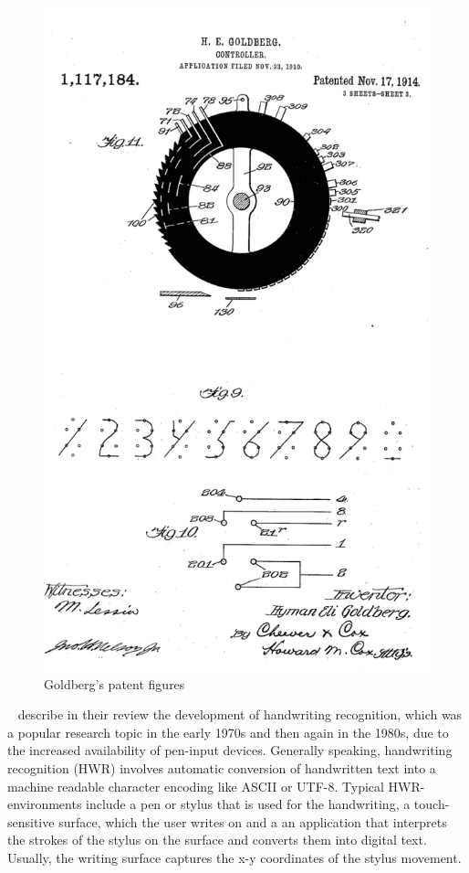 \begin{figure}[htbp]
\begin{center}
\includegraphics[scale=0.3]{images/goldberg3.png}
\caption{Goldberg's patent figures}
\label{fig:goldbergspatent}
\end{center}
\end{figure}

~\citeyear{Tappert1990} describe in their review 
the development of handwriting recognition, which was a popular research 
topic in the early 1970s and then again in the 1980s, 
due to the increased availability of pen-input devices. 
Generally speaking, handwriting recognition (HWR) 
involves automatic conversion of handwritten text into a machine readable 
character encoding like ASCII or UTF-8. Typical HWR-environments include 
a pen or stylus that is used for the handwriting, a touch-sensitive surface, 
which the user writes on and a an application that interprets the strokes 
of the stylus on the surface and converts them into digital text. 
Usually, the writing surface captures the x-y coordinates of the stylus 
movement.

